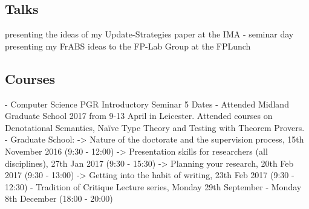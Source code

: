\subsection{Talks}
presenting the ideas of my Update-Strategies paper at the IMA - seminar day
presenting my FrABS ideas to the FP-Lab Group at the FPLunch

\subsection{Courses}
- Computer Science PGR Introductory Seminar 5 Dates
- Attended Midland Graduate School 2017 from 9-13 April in Leicester. Attended courses on Denotational Semantics, Naïve Type Theory and Testing with Theorem Provers.
- Graduate School: 
	-> Nature of the doctorate and the supervision process, 15th November 2016 (9:30 - 12:00)
	-> Presentation skills for researchers (all disciplines), 27th Jan 2017 (9:30 - 15:30)
	-> Planning your research, 20th Feb 2017 (9:30 - 13:00)
	-> Getting into the habit of writing, 23th Feb 2017 (9:30 - 12:30)
- Tradition of Critique Lecture series, Monday 29th September - Monday 8th December (18:00 - 20:00)